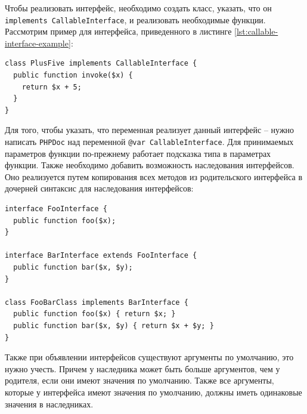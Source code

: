 Чтобы реализовать интерфейс, необходимо создать класс, указать, что он \verb|implements CallableInterface|, и реализовать необходимые функции.
Рассмотрим пример для интерфейса, приведенного в листинге \ref{lst:callable-interface-example}:
\begin{lstlisting}
class PlusFive implements CallableInterface {
  public function invoke($x) {
    return $x + 5;
  } 
}
\end{lstlisting}

Для того, чтобы указать, что переменная реализует данный интерфейс -- нужно написать \verb|PHPDoc| \cite{phpdoc} над переменной \verb|@var CallableInterface|.
Для принимаемых параметров функции по-прежнему работает подсказка типа в параметрах функции.
Также необходимо добавить возможность наследования интерфейсов.
Оно реализуется путем копирования всех методов из родительского интерфейса в дочерней синтаксис для наследования интерфейсов:
\begin{lstlisting}
interface FooInterface {
  public function foo($x);
}

interface BarInterface extends FooInterface {
  public function bar($x, $y);
}

class FooBarClass implements BarInterface {
  public function foo($x) { return $x; }
  public function bar($x, $y) { return $x + $y; }
}
\end{lstlisting}

Также при объявлении интерфейсов существуют аргументы по умолчанию, это нужно учесть.
Причем у наследника может быть больше аргументов, чем у родителя, если они имеют значения по умолчанию.
Также все аргументы, которые у интерфейса имеют значения по умолчанию, должны иметь одинаковые значения в наследниках.

